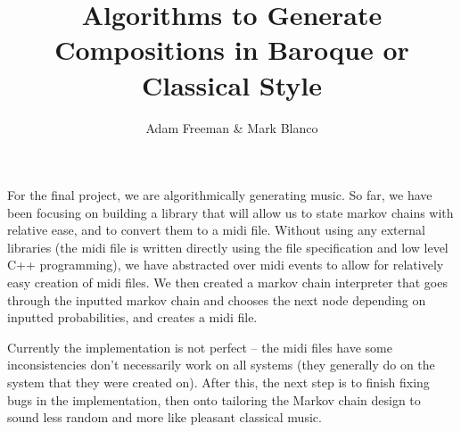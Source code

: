 \documentclass [12pt]{article}
\begin{document}
\title {Algorithms to Generate Compositions in Baroque or Classical Style}
\author {Adam Freeman & Mark Blanco}
\maketitle

For the final project, we are algorithmically generating music. So
far, we have been focusing on building a library that will allow us to
state markov chains with relative ease, and to convert them to a midi
file.  Without using any external libraries (the midi file is written
directly using the file specification and low level C++ programming),
we have abstracted over midi events to allow for relatively easy
creation of midi files. We then created a markov chain interpreter
that goes through the inputted markov chain and chooses the next node
depending on inputted probabilities, and creates a midi file.

Currently the implementation is not perfect -- the midi files have
some inconsistencies don't necessarily work on all systems (they
generally do on the system that they were created on).  After this,
the next step is to finish fixing bugs in the implementation, then onto
tailoring the Markov chain design to sound less random and more like
pleasant classical music.
\end{document}

